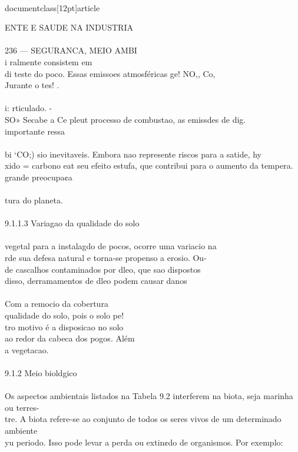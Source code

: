 \\documentclass[12pt]{article}
\begin{document}
ENTE E SAUDE NA INDUSTRIA\\
\\
236 — SEGURANCA, MEIO AMBI\\
i ralmente consistem em\\
di teste do poco. Essas emissoes atmosféricas ge! NO,, Co,\\
Jurante o tes! .\\
\\
i: rticulado. -\\
SO» Secabe a Ce pleut processo de combustao, as emissdes de dig.\\
importante ressa\\
\\
bi ‘CO;) sio inevitaveis. Embora nao represente riscos para a satide, hy\\
xido = carbono eat seu efeito estufa, que contribui para o aumento da tempera.\\
grande preocupa¢a\\
\\
tura do planeta.\\
\\
9.1.1.3 Variagao da qualidade do solo\\
\\
vegetal para a instalagdo de pocos, ocorre uma variacio na\\
rde sua defesa natural e torna-se propenso a erosio. Ou-\\
de cascalhos contaminados por dleo, que sao dispostos\\
disso, derramamentos de dleo podem causar danos\\
\\
Com a remocio da cobertura\\
qualidade do solo, pois o solo pe!\\
tro motivo é a disposicao no solo\\
ao redor da cabeca dos pogos. Além\\
a vegetacao.\\
\\
9.1.2 Meio bioldgico\\
\\
Os aspectos ambientais listados na Tabela 9.2 interferem na biota, seja marinha ou terres-\\
tre. A biota refere-se ao conjunto de todos os seres vivos de um determinado ambiente\\
yu periodo. Isso pode levar a perda ou extin¢do de organismos. Por exemplo:\\
\\
\end{document}
